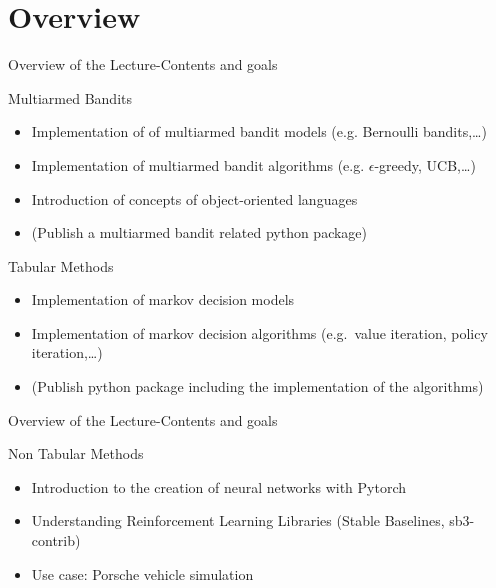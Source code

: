 \section{Overview}

\begin{frame}{Overview of the Lecture-Contents and goals}
    \begin{content}{Multiarmed Bandits}
        \begin{itemize}
            \item Implementation of of multiarmed bandit models (e.g. Bernoulli bandits,\dots)
            \item Implementation of multiarmed bandit algorithms (e.g. $\epsilon$-greedy, UCB,\dots)
            \item Introduction of concepts of object-oriented languages
            \item (Publish a multiarmed bandit related python package)
        \end{itemize}
    \end{content}
    \begin{content}{Tabular Methods}
        \begin{itemize}
            \item  Implementation of markov decision models
            \item Implementation of markov decision algorithms (e.g.\ value iteration, policy iteration,\dots)
            \item (Publish python package including the implementation of the algorithms)
        \end{itemize}
    \end{content}
\end{frame}
\begin{frame}{Overview of the Lecture-Contents and goals}
    \begin{content}{Non Tabular Methods}
        \begin{itemize}
            \item Introduction to the creation of neural networks with Pytorch
            \item Understanding Reinforcement Learning Libraries (Stable Baselines, sb3-contrib)
            \item Use case: Porsche vehicle simulation
        \end{itemize}
    \end{content}
\end{frame}